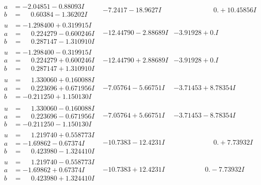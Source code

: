 \documentclass[1p]{elsarticle_modified}
\theoremstyle{definition}
\begin{document}
$$\begin{array}{c|c|c}
\begin{aligned}
a &= -2.04851 - 0.88093 I \\
b &= \phantom{-}0.60384 - 1.36202 I\end{aligned}
 & -7.2417 - 18.9627 I & \phantom{-0.000000 -}0. + 10.45856 I \\ \hline\begin{aligned}
u &= -1.298400 + 0.319915 I \\
a &= \phantom{-}0.224279 - 0.600246 I \\
b &= \phantom{-}0.287147 - 1.310910 I\end{aligned}
 & -12.44790 - 2.88689 I & -3.91928 + 0. I\phantom{ +0.000000I} \\ \hline\begin{aligned}
u &= -1.298400 - 0.319915 I \\
a &= \phantom{-}0.224279 + 0.600246 I \\
b &= \phantom{-}0.287147 + 1.310910 I\end{aligned}
 & -12.44790 + 2.88689 I & -3.91928 + 0. I\phantom{ +0.000000I} \\ \hline\begin{aligned}
u &= \phantom{-}1.330060 + 0.160088 I \\
a &= \phantom{-}0.223696 + 0.671956 I \\
b &= -0.211250 + 1.150130 I\end{aligned}
 & -7.05764 - 5.66751 I & -3.71453 + 8.78354 I \\ \hline\begin{aligned}
u &= \phantom{-}1.330060 - 0.160088 I \\
a &= \phantom{-}0.223696 - 0.671956 I \\
b &= -0.211250 - 1.150130 I\end{aligned}
 & -7.05764 + 5.66751 I & -3.71453 - 8.78354 I \\ \hline\begin{aligned}
u &= \phantom{-}1.219740 + 0.558773 I \\
a &= -1.69862 - 0.67374 I \\
b &= \phantom{-}0.423980 - 1.324410 I\end{aligned}
 & -10.7383 - 12.4231 I & \phantom{-0.000000 -}0. + 7.73932 I \\ \hline\begin{aligned}
u &= \phantom{-}1.219740 - 0.558773 I \\
a &= -1.69862 + 0.67374 I \\
b &= \phantom{-}0.423980 + 1.324410 I\end{aligned}
 & -10.7383 + 12.4231 I & \phantom{-0.000000 } 0. - 7.73932 I \\ \hline\begin{aligned}

\end{aligned}
\end{array}$$
\end{document}
